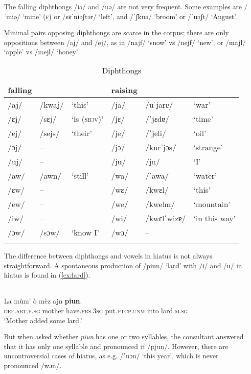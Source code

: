 The falling diphthongs /iə/ and /uə/ are not very frequent. Some examples are /ˈmiə/ `mine' (\textsc{f}) or /sɐˈniəʃtər/ `left', and /ˈʃkuə/ `broom' or /ˈuəʃt/ `August'.

Minimal pairs opposing diphthongs are scarce in the corpus; there are only oppositions between /aj/ and /ej/, as in /najf/ `snow' vs /nejf/ `new', or /majl/ `apple' vs /mejl/ `honey'.

\begin{table}
\caption{Diphthongs}
	\label{diph}
	\begin{tabular}{llllll}
		\lsptoprule
		falling & & & raising & & \\
		\midrule
		/aj/ & /kwaj/ & `this' & /ja/ & /uˈjarɐ/ & `war'\\
		/ɛj/ & /sɛj/ & `is (\textsc{sbjv})' & /jɛ/ & /ˈjɛdɐ/ & `time'\\
		/ej/ & /sejs/ & `their' & /je/ & /ˈjeli/ & `oil'\\
		/ɔj/ & -- & & /jɔ/ & /kurˈjɔs/ & `strange'\\
		/uj/ & -- & & /ju/ & /ju/ & `I'\\
		/aw/ & /awn/ & `still' & /wa/ & /ˈawa/ & `water'\\
		/ɛw/ & -- & & /wɛ/ & /kwɛl/ & `this'\\
		/ew/ &  -- & & /we/ & /kwelm/ & `mountain'\\
		/iw/ & -- & & /wi/ & /kwɛlˈwizɐ/ & `in this way'\\
		/ɔw/ & /sɔw/ & `know I' & /wɔ/ & -- \\
		\lspbottomrule
	\end{tabular}
\end{table}

The difference between diphthongs and vowels in hiatus is not always straightforward. A spontaneous production of /piun/ `lard' with /i/ and /u/ in hiatus is found in (\ref{ex:lard}).

\ea\label{ex:lard}
\\
\gll La mùm' ò mèz ajn \textbf{piun}.\\
\textsc{def.art.f.sg} mother have.\textsc{prs.3sg} put.\textsc{ptcp.unm} into lard.\textsc{m.sg}\\
\glt `Mother added some lard.'
\z

But when asked whether \textit{piun} has one or two syllables, the consultant answered that it has only one syllable and pronounced it /pjun/. However, there are uncontroversial cases of hiatus, as e.g. /ˈuɔn/ `this year', which is never pronounced /wɔn/.

